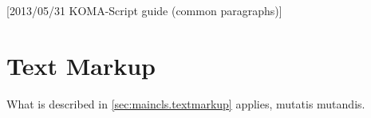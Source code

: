 %
%
%
%
%
%
%
%
% 
%
%
%
%

[2013/05/31 KOMA-Script guide (common paragraphs)]


\makeatletter
{}%
%
%
%
\makeatother


\section{Text Markup}
\label{sec:\csname label@base\endcsname.textmarkup}%
\IgnoreThisfalse
\ifshortversion\IgnoreThistrue\ifCommonmaincls\IgnoreThisfalse\fi\fi%
\ifIgnoreThis %
What is described in
\autoref{sec:maincls.textmarkup} applies, mutatis mutandis.
\else %
%
%

